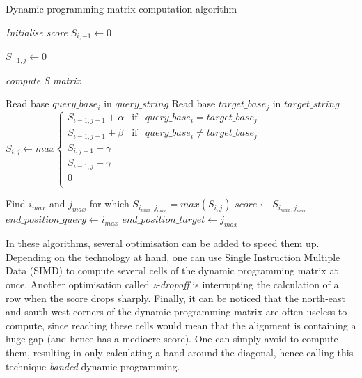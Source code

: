 \begin{algorithm}[h!]
	\caption{Dynamic programming matrix computation algorithm}
	\label{algo:local}
	\begin{algorithmic}[1] %
		 \Comment{}
		

		\State \emph{Initialise score}
			\State $S_{i, -1} \leftarrow 0$
		\EndFor	
				
			\State $S_{-1, j} \leftarrow 0$	
		\EndFor
		
		\State \emph{compute S matrix}
			
				\State Read base $query\_base_i$ in $query\_string$
				\State Read base $target\_base_j$ in $target\_string$ 	
				\State $ 	S_{i,j} \leftarrow max \left\{
				\begin{array}{llll}
				S_{i-1, j-1} + \alpha & \mbox{if} & query\_base_i = target\_base_j \\
				S_{i-1, j-1} + \beta & \mbox{if} & query\_base_i \neq target\_base_j \\
				S_{i, j-1} + \gamma \\
				S_{i-1, j} + \gamma\\
				0 \\
				\end{array}
				\right. $
				
			\EndFor
			
		\EndFor
		
		\State Find $i_{max}$ and $j_{max}$ for which $S_{i_{max}, j_{max}} = max(S_{i,j})$
		\State $score \leftarrow S_{i_{max}, j_{max}}$
		\State $end\_position\_query \leftarrow i_{max}$
		\State $end\_position\_target \leftarrow j_{max}$
		
		\EndProcedure
		
	\end{algorithmic}
\end{algorithm}

In these algorithms, several optimisation can be added to speed them up. Depending on the technology at hand, one can use Single Instruction Multiple Data (SIMD) to compute several cells of the dynamic programming matrix at once. Another optimisation called \emph{z-dropoff} is interrupting the calculation of a row when the score drops sharply. Finally, it can be noticed that the north-east and south-west corners of the dynamic programming matrix are often useless to compute, since reaching these cells would mean that the alignment is containing a huge gap (and hence has a mediocre score). One can simply avoid to compute them, resulting in only calculating a band around the diagonal, hence calling this technique \emph{banded} dynamic programming.
